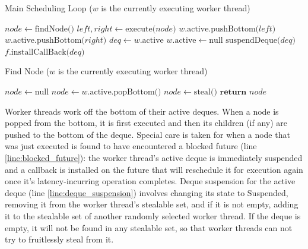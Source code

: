 \documentclass[bsc,frontabs,singlespacing,parskip,deptreport,normalheadings]{infthesis}
\begin{document}
\begin{algorithm}
\caption{Main Scheduling Loop ($w$ is the currently executing worker thread)}
\label{alg:scheduling_loop}
\begin{algorithmic}[1]
         \label{line:loop}
            \State $node \gets \text{findNode()}$
            \State $left, right \gets \text{execute(}node\text{)}$
                \State $w \text{.active.pushBottom(}left\text{)}$
            \EndIf
                \State $w \text{.active.pushBottom(}right\text{)}$
            \EndIf
            \label{line:future_start} \label{line:blocked_future}
                \State $deq \gets w \text{.active}$
                \State $w \text{.active} \gets \text{null}$
                \State $\text{suspendDeque(}deq\text{)}$
                \State $f\text{.installCallBack(} deq \text{)}$
                    \label{line:install_callback}
            \EndIf \label{line:future_end}
        \EndWhile
    \EndFunction
\end{algorithmic}
\end{algorithm}

\begin{algorithm}
\caption{Find Node ($w$ is the currently executing worker thread)}
\label{alg:find_node}
\begin{algorithmic}[1]
        \State $node \gets \text{null}$
            \State $node \gets w \text{.active.popBottom()}$
        \EndIf
         \label{line:no_work}
            \State $node \gets \text{steal()}$
        \EndIf
        \State $\textbf{return } node$
    \EndFunction
\end{algorithmic}
\end{algorithm}

Worker threads work off the bottom of their active deques. When a node is popped
from the bottom, it is first executed and then its children (if any) are pushed
to the bottom of the deque. Special care is taken for when a node that was just
executed is found to have encountered a blocked future (line
\ref{line:blocked_future}): the worker thread's active deque is immediately
suspended and a callback is installed on the future that will reschedule it for
execution again once it's latency-incurring operation completes. Deque
suspension for the active deque (line \ref{line:deque_suspension}) involves
changing its state to Suspended, removing it from the worker thread's stealable
set, and if it is not empty, adding it to the stealable set of another randomly
selected worker thread. If the deque is empty, it will not be found in any
stealable set, so that worker threads can not try to fruitlessly steal from it. 
\end{document}
